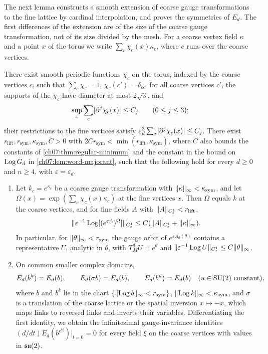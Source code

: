 The next lemma constructs a smooth extension of coarse gauge transformations to the fine lattice by cardinal interpolation, and proves the symmetries of $E_d$. The first differences of the extension are of the size of the coarse gauge transformation, not of its size divided by the mesh. For a coarse vertex field $\kappa$ and a point $x$ of the torus we write $\sum_c\chi_c(x)\kappa_c$, where $c$ runs over the coarse vertices.

\begin{lemma}\label{ch07:lem:classical-symmetries}
There exist smooth periodic functions $\chi_c$ on the torus, indexed by the coarse vertices $c$, such that $\sum_c\chi_c=1$, $\chi_c(c')=\delta_{cc'}$ for all coarse vertices $c'$, the supports of the $\chi_c$ have diameter at most $2\sqrt3$, and
\[
 \sup_x\sum_c\lvert \partial^j\chi_c(x)\rvert\le C_j\qquad(0\le j\le3);
\]
their restrictions to the fine vertices satisfy $\varepsilon_d^3\sum_x\lvert \partial^j\chi_c(x)\rvert\le C_j$. There exist $r_{\mathrm{lift}},r_{\mathrm{sym}},\kappa_{\mathrm{sym}},C>0$ with $2Cr_{\mathrm{sym}}<\min(r_{\mathrm{lift}},\kappa_{\mathrm{sym}})$, where $C$ also bounds the constants of \cref{ch07:thm:regular-minimum} and the constant in the bound on $\operatorname{Log} G_d$ in \cref{ch07:lem:word-majorant}, such that the following hold for every $d\ge0$ and $n\ge4$, with $\varepsilon=\varepsilon_d$.
\begin{enumerate}
\item Let $k_c=e^{\kappa_c}$ be a coarse gauge transformation with $\lVert \kappa\rVert_\infty<\kappa_{\mathrm{sym}}$, and let $\Omega(x)=\exp(\sum_c\chi_c(x)\kappa_c)$ at the fine vertices $x$. Then $\Omega$ equals $k$ at the coarse vertices, and for fine fields $A$ with $\lVert A\rVert_{C^1_\varepsilon}<r_{\mathrm{lift}}$,
\[
 \lVert \varepsilon^{-1}\operatorname{Log}[(e^{\varepsilon A})^\Omega]\rVert_{C^1_\varepsilon}\le C(\lVert A\rVert_{C^1_\varepsilon}+\lVert \kappa\rVert_\infty).
\]
In particular, for $\lVert \theta\rVert_\infty<r_{\mathrm{sym}}$ the gauge orbit of $e^{\varepsilon A_d(\theta)}$ contains a representative $U$, analytic in $\theta$, with $T_M^dU=e^\theta$ and $\lVert \varepsilon^{-1}\operatorname{Log} U\rVert_{C^1_\varepsilon}\le C\lVert \theta\rVert_\infty$.
\item On common smaller complex domains,
\[
 E_d(b^k)=E_d(b),\qquad E_d(\sigma b)=E_d(b),\qquad E_d(b^u)=E_d(b)\quad(u\in\mathrm{SU}(2)\text{ constant}),
\]
where $b$ and $b^k$ lie in the chart $\{\lVert \operatorname{Log} b\rVert_\infty<r_{\mathrm{sym}}\}$, $\lVert \operatorname{Log} k\rVert_\infty<\kappa_{\mathrm{sym}}$, and $\sigma$ is a translation of the coarse lattice or the spatial inversion $x\mapsto-x$, which maps links to reversed links and inverts their variables. Differentiating the first identity, we obtain the infinitesimal gauge-invariance identities $(d/dt)E_d(b^{e^{t\xi}})|_{t=0}=0$ for every field $\xi$ on the coarse vertices with values in $\mathfrak{su}(2)$.
\end{enumerate}
\end{lemma}


